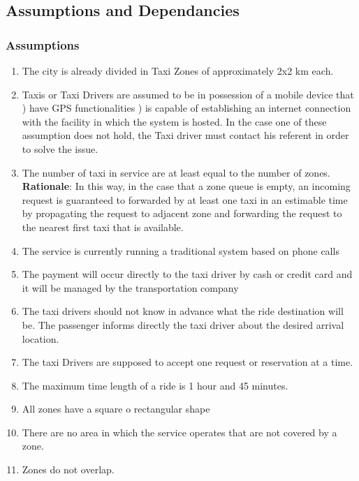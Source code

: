 \documentclass[11pt, a4paper,titlepage]{article}
\begin{document}
\subsection{Assumptions and Dependancies}
\subsubsection{Assumptions}
	\begin{enumerate}
		\item \label{itm: Assumption_Zones} The city is already divided in Taxi Zones of approximately 2x2 km each. 
		\item \label{itm: Assumption_MobileProvisioning} Taxis or Taxi Drivers are assumed to be in possession of a mobile device that  
			) have GPS functionalities 
			) is capable of establishing an internet connection with the facility in which the system is hosted. In the case one of these assumption does not hold, the Taxi driver must contact his referent in order to solve the issue.
		\item \label{itm: Assumption_NumberOfTaxis} The number of taxi in service are at least equal to the number of zones.
		\textbf{Rationale}: In this way, in the case that a zone queue is empty, an incoming request is guaranteed to forwarded by at least one taxi in an estimable time by propagating the request to adjacent zone and forwarding the request to the nearest first taxi that is available.
		\item \label{itm: Assumption_FormerSystems} The service is currently running a traditional system based on phone calls	
		\item \label{itm: Assumption_Payment} The payment will occur directly to the taxi driver by cash or credit card and it will be managed by the transportation company
		\item \label{itm: Assumption_Destination} The taxi drivers should not know in advance what the ride destination will be. The passenger informs directly the taxi driver about the desired arrival location.
		\item \label{itm: Assumption_OneReservation} The taxi Drivers are supposed to accept one request or reservation at a time.
		\item \label{itm: Assumption_LengthTime} The maximum time length of a ride is 1 hour and 45 minutes.
		\item \label{itm: Assumption_SquareZones} All zones have a square o rectangular shape
		\item \label{itm: Assumption_Coverage} There are no area in which the service operates that are not covered by a zone.
		\item \label{itm: Assumption_Overlapping} Zones do not overlap.
	\end{enumerate}
\pagebreak
\end{document}
